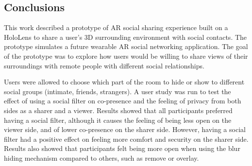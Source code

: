 
\subsection{Conclusions}

This work described a prototype of AR social sharing experience built on a HoloLens to share a user's 3D surrounding environment with social contacts. The prototype simulates a future wearable AR social networking application. The goal of the prototype was to explore how users would be willing to share views of their surroundings with remote people with different social relationships. 

Users were allowed to choose which part of the room to hide or show to different social groups (intimate, friends, strangers). A user study was run to test the effect of using a social filter on co-presence and the feeling of privacy from both sides as a sharer and a viewer. Results showed that all participants preferred having a social filter, although it causes the feeling of being less open on the viewer side, and of lower co-presence on the sharer side. However, having a social filter had a positive effect on feeling more comfort and security on the sharer side. Results also showed that participants felt being more open when using the blur hiding mechanism compared to others, such as remove or overlay. 
